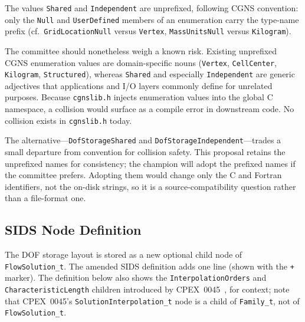 \documentclass[11pt,letterpaper]{article}
\begin{document}
The values \texttt{Shared} and \texttt{Independent} are unprefixed,
following CGNS convention: only the \texttt{Null} and
\texttt{UserDefined} members of an enumeration carry the type-name
prefix (cf.\ \texttt{GridLocationNull} versus \texttt{Vertex},
\texttt{MassUnitsNull} versus \texttt{Kilogram}).

The committee should nonetheless weigh a known risk.  Existing
unprefixed CGNS enumeration values are domain-specific nouns
(\texttt{Vertex}, \texttt{CellCenter}, \texttt{Kilogram},
\texttt{Structured}), whereas \texttt{Shared} and especially
\texttt{Independent} are generic adjectives that applications and I/O
layers commonly define for unrelated purposes.  Because
\texttt{cgnslib.h} injects enumeration values into the global C
namespace, a collision would surface as a compile error in downstream
code.  No collision exists in \texttt{cgnslib.h} today.

The alternative---\texttt{DofStorageShared} and
\texttt{DofStorageIndependent}---trades a small departure from
convention for collision safety.  This proposal retains the
unprefixed names for consistency; the champion will adopt the
prefixed names if the committee prefers.  Adopting them would change
only the C and Fortran identifiers, not the on-disk strings, so it is
a source-compatibility question rather than a file-format one.

\subsection{SIDS Node Definition}
\label{sec:sids-node}

The DOF storage layout is stored as a new optional child node of
\texttt{FlowSolution\_t}.  The amended SIDS definition adds one line
(shown with the \texttt{+} marker).  The definition below also shows the
\texttt{InterpolationOrders} and \texttt{CharacteristicLength} children
introduced by CPEX~0045~\cite{cpex0045}, for context; note that
CPEX~0045's \texttt{SolutionInterpolation\_t} node is a child of
\texttt{Family\_t}, not of \texttt{FlowSolution\_t}.
\end{document}

